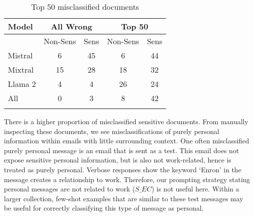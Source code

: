 \begin{table}[]
\centering
\caption{Top 50 misclassified documents}
\label{table:misclassified}
\begin{tabular}{@{}lcccc@{}}
\toprule
Model   & \multicolumn{2}{c}{All Wrong} & \multicolumn{2}{c}{Top 50} \\ \midrule
        & Non-Sens   & Sens   & Non-Sens  & Sens \\
Mistral & 6               & 45          & 6              & 44        \\
Mixtral & 15              & 28          & 18             & 32        \\
Llama 2 & 4               & 4           & 26             & 24        \\
All     & 0               & 3           & 8              & 42        \\ \bottomrule

\vspace{-0.95cm}
\end{tabular}
\end{table}

There is a higher proportion of misclassified sensitive documents. From manually inspecting these documents, we see misclassifications of purely personal information within emails with little surrounding context. One often misclassified purely personal message is an email that is sent as a test. This email does not expose sensitive personal information, but is also not work-related, hence is treated as purely personal. Verbose responses show the keyword ‘Enron’ in the message creates a relationship to work. Therefore, our prompting strategy stating personal messages are not related to work ($S\_EC$) is not useful here. Within a larger collection, few-shot examples that are similar to these test messages may be useful for correctly classifying this type of message as personal. 

